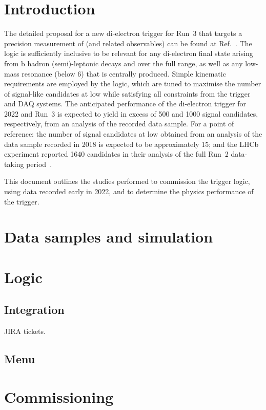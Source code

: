 \clearpage
\section{Introduction}

The detailed proposal for a new di-electron trigger for Run~3 that
targets a precision measurement of \rk (and related observables) can
be found at Ref.~\cite{AN-21-160}. The logic is sufficiently inclusive
to be relevant for any di-electron final state arising from b hadron
(semi)-leptonic decays and over the full \qsq range, as well as any
low-mass resonance (below 6\GeV) that is centrally produced. Simple
kinematic requirements are employed by the logic, which are tuned to
maximise the number of signal-like \bkee candidates at low \qsq while
satisfying all constraints from the trigger and DAQ systems. The
anticipated performance of the di-electron trigger for 2022 and Run~3
is expected to yield in excess of 500 and 1000 signal candidates,
respectively, from an analysis of the recorded data sample. For a
point of reference: the number of \bkee signal candidates at low \qsq
obtained from an analysis of the \bparking data sample recorded in
2018 is expected to be approximately 15; and the LHCb experiment
reported 1640 candidates in their analysis of the full Run~2
data-taking period~\cite{LHCb:2021trn}.

This document outlines the studies performed to commission the trigger
logic, using data recorded early in 2022, and to determine the physics
performance of the trigger.

\clearpage
\section{Data samples and simulation}

\clearpage
\section{Logic}

\subsection{Integration}

JIRA tickets.


\subsection{Menu}


\clearpage
\section{Commissioning}


